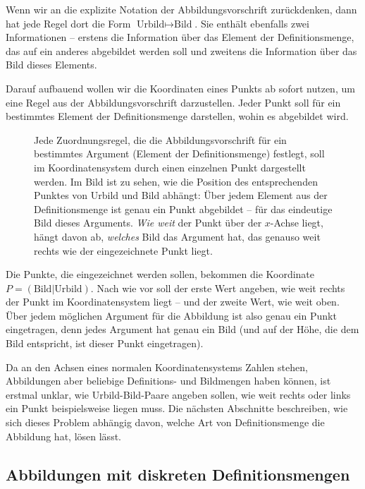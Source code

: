 \documentclass[../../main.tex]{subfiles}
\begin{document}
Wenn wir an die explizite Notation der Abbildungsvorschrift zurückdenken, dann hat jede Regel dort die Form $\text{Urbild}\mapsto\text{Bild}$. Sie enthält ebenfalls zwei Informationen -- erstens die Information über das Element der Definitionsmenge, das auf ein anderes abgebildet werden soll und zweitens die Information über das Bild dieses Elements.

Darauf aufbauend wollen wir die Koordinaten eines Punkts ab sofort nutzen, um eine Regel aus der Abbildungsvorschrift darzustellen. Jeder Punkt soll für ein bestimmtes Element der Definitionsmenge darstellen, wohin es abgebildet wird.

\begin{figure}[ht]
    \centering
    
    \caption{Jede Zuordnungsregel, die die Abbildungsvorschrift für ein bestimmtes Argument (Element der Definitionsmenge) festlegt, soll im Koordinatensystem durch einen einzelnen Punkt dargestellt werden.
    Im Bild ist zu sehen, wie die Position des entsprechenden Punktes von Urbild und Bild abhängt: Über jedem Element aus der Definitionsmenge ist genau ein Punkt abgebildet -- für das eindeutige Bild dieses Arguments. \emph{Wie weit} der Punkt über der $x$-Achse liegt, hängt davon ab, \emph{welches} Bild das Argument hat, das genauso weit rechts wie der eingezeichnete Punkt liegt.}
\end{figure}

Die Punkte, die eingezeichnet werden sollen, bekommen die Koordinate $P=(\text{Bild}|\text{Urbild})$. Nach wie vor soll der erste Wert angeben, wie weit rechts der Punkt im Koordinatensystem liegt -- und der zweite Wert, wie weit oben.
Über jedem möglichen Argument für die Abbildung ist also genau ein Punkt eingetragen, denn jedes Argument hat genau ein Bild  (und auf der Höhe, die dem Bild entspricht, ist dieser Punkt eingetragen).

Da an den Achsen eines normalen Koordinatensystems Zahlen stehen, Abbildungen aber beliebige Definitions- und Bildmengen haben können, ist erstmal unklar, wie Urbild-Bild-Paare angeben sollen, wie weit rechts oder links ein Punkt beispielsweise liegen muss. Die nächsten Abschnitte beschreiben, wie sich dieses Problem abhängig davon, welche Art von Definitionsmenge die Abbildung hat, lösen lässt.

\subsection{Abbildungen mit diskreten Definitionsmengen}
\label{sec:abbildungen_graphen_diskret}
\end{document}
